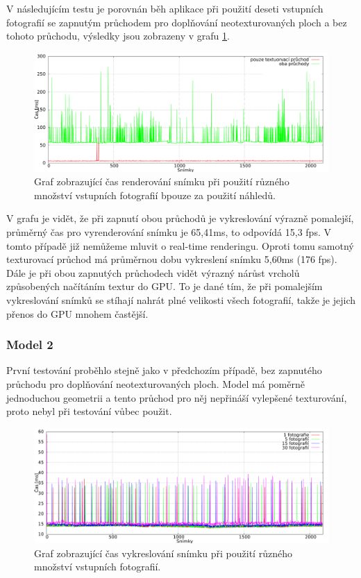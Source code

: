 \documentclass[11pt,twoside,a4paper]{book}
\begin{document}
V následujícím testu je porovnán běh aplikace při použití deseti vstupních fotografií se zapnutým průchodem pro doplňování neotexturovaných ploch a bez tohoto průchodu, výsledky jsou zobrazeny v grafu \ref{fig:data-3}.  

\begin{figure}[hb]
\begin{center}
\includegraphics[width=\textwidth]{figures/data-3}
\caption{Graf zobrazující čas renderování snímku při použití různého množství vstupních fotografií bpouze za použití náhledů.}
\label{fig:data-3}
\end{center}
\end{figure}

V grafu je vidět, že při zapnutí obou průchodů je vykreslování výrazně pomalejší, průměrný čas pro vyrenderování snímku je 65,41ms, to odpovídá 15,3 fps. V tomto případě již nemůžeme mluvit o real-time renderingu.  Oproti tomu samotný texturovací průchod má průměrnou dobu vykreslení snímku 5,60ms (176 fps). Dále je při obou zapnutých  průchodech vidět výrazný nárůst vrcholů způsobených načítáním textur do GPU. To je dané tím, že při pomalejším vykreslování snímků se stíhají nahrát plné velikosti všech fotografií, takže je jejich přenos do GPU mnohem častější.

\subsubsection*{Model 2}

První testování proběhlo stejně jako v předchozím případě, bez zapnutého průchodu pro doplňování neotexturovaných ploch. Model má poměrně jednoduchou geometrii a tento průchod pro něj nepřináší vylepšené texturování, proto nebyl při testování vůbec použit. 

\begin{figure}[h]
\begin{center}
\includegraphics[width=\textwidth]{figures/data-4}
\caption{Graf zobrazující čas vykreslování snímku při použití různého množství vstupních fotografií.}
\label{fig:data-4}
\end{center}
\end{figure}
\end{document}
